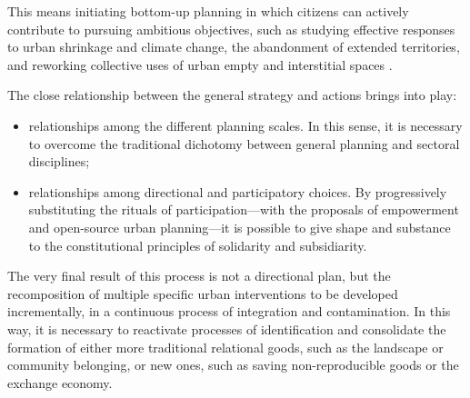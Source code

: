 \documentclass[10pt,a4paper]{article}
\renewcommand*{\refname}{References and Notes}
\begin{document}
\begin{multicols}{2}
This means initiating bottom-up planning in which citizens can actively contribute to pursuing ambitious objectives, such as studying effective responses to urban shrinkage and climate change, the abandonment of extended territories, and reworking collective uses of urban empty and interstitial spaces \citep{r61, r62, r06}.

The close relationship between the general strategy and actions brings into play:

\begin{itemize}
	\item relationships among the different planning scales. In this sense, it is necessary to overcome the traditional dichotomy between general planning and sectoral disciplines;
	\item relationships among directional and participatory choices. By progressively substituting the rituals of participation---with the proposals of empowerment and open-source urban planning---it is possible to give shape and substance to the constitutional principles of solidarity and subsidiarity. 
\end{itemize}

The very final result of this process is not a directional plan, but the recomposition of multiple specific urban interventions to be developed incrementally, in a continuous process of integration and contamination. In this way, it is necessary to reactivate processes of identification and consolidate the formation of either more traditional relational goods, such as the landscape or community belonging, or new ones, such as saving non-reproducible goods or the exchange economy.

\end{multicols}
\clearpage

\vspace{\baselineskip}

\begin{multicols}{2}
\renewcommand*{\refname}{\normalsize{References and Notes}}

\begin{footnotesize}


\end{footnotesize}

\end{multicols}
\end{document}
